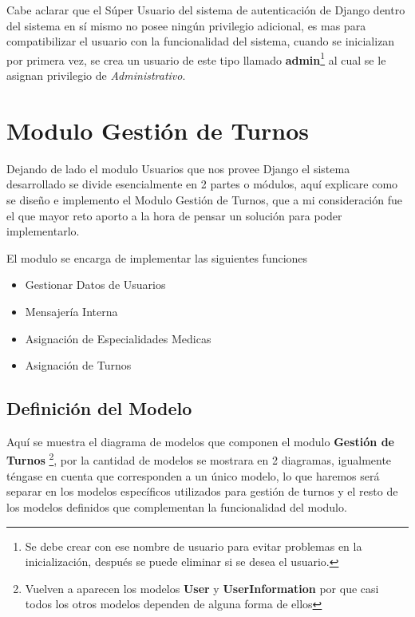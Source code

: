 Cabe aclarar que el Súper Usuario del sistema de autenticación de Django dentro del sistema en sí mismo no posee ningún privilegio adicional, es mas para compatibilizar el usuario con la funcionalidad del sistema, cuando se inicializan por primera vez, se crea un usuario de este tipo llamado \textbf{admin}\footnote{Se debe crear con ese nombre de usuario para evitar problemas en la inicialización, después se puede eliminar si se desea el usuario.} al cual se le asignan privilegio de \textit{Administrativo}.



\section{Modulo Gestión de Turnos} 

Dejando de lado el modulo Usuarios que nos provee Django el sistema desarrollado se divide esencialmente en 2 partes o módulos, aquí explicare como se diseño e implemento el Modulo Gestión de Turnos, que a mi consideración fue el que mayor reto aporto a la hora de pensar un solución para poder implementarlo.

El modulo se encarga de implementar las siguientes funciones

\begin{itemize}
    \item Gestionar Datos de Usuarios
    \item Mensajería Interna
    \item Asignación de Especialidades Medicas
    \item Asignación de Turnos
\end{itemize}


\subsection{Definición del Modelo}

Aquí se muestra el diagrama de modelos que componen el modulo \textbf{Gestión de Turnos} \footnote{Vuelven a aparecen los modelos \textbf{User} y \textbf{UserInformation} por que casi todos los otros modelos dependen de alguna forma de ellos}, por la cantidad de modelos se mostrara en 2 diagramas, igualmente téngase en cuenta que corresponden a un único modelo, lo que haremos será separar en los modelos específicos utilizados para gestión de turnos y el resto de los modelos definidos que complementan la funcionalidad del modulo.


